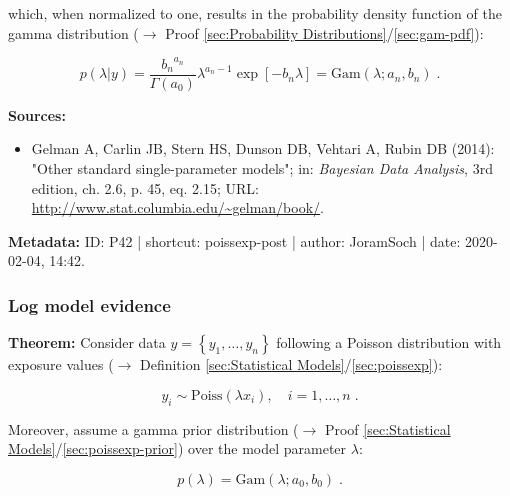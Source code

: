 \documentclass[a4paper,12pt,twoside]{book}
\begin{document}
which, when normalized to one, results in the probability density function of the gamma distribution ($\rightarrow$ Proof \ref{sec:Probability Distributions}/\ref{sec:gam-pdf}):

\begin{equation} \label{eq:poissexp-post-Poiss-exp-post-s3}
p(\lambda|y) = \frac{ {b_n}^{a_n}}{\Gamma(a_0)} \lambda^{a_n-1} \exp\left[-b_n \lambda\right] = \mathrm{Gam}(\lambda; a_n, b_n) \; .
\end{equation}


\vspace{1em}
\textbf{Sources:}
\begin{itemize}
\item Gelman A, Carlin JB, Stern HS, Dunson DB, Vehtari A, Rubin DB (2014): "Other standard single-parameter models"; in: \textit{Bayesian Data Analysis}, 3rd edition, ch. 2.6, p. 45, eq. 2.15; URL: \url{http://www.stat.columbia.edu/~gelman/book/}.
\end{itemize}


\vspace{1em}
\textbf{Metadata:} ID: P42 | shortcut: poissexp-post | author: JoramSoch | date: 2020-02-04, 14:42.
\vspace{1em}



\subsubsection[\textbf{Log model evidence}]{Log model evidence} \label{sec:poissexp-lme}
\setcounter{equation}{0}

\textbf{Theorem:} Consider data $y = \left\lbrace y_1, \ldots, y_n \right\rbrace$ following a Poisson distribution with exposure values ($\rightarrow$ Definition \ref{sec:Statistical Models}/\ref{sec:poissexp}):

\begin{equation} \label{eq:poissexp-lme-Poiss-exp}
y_i \sim \mathrm{Poiss}(\lambda x_i), \quad i = 1, \ldots, n \; .
\end{equation}

Moreover, assume a gamma prior distribution ($\rightarrow$ Proof \ref{sec:Statistical Models}/\ref{sec:poissexp-prior}) over the model parameter $\lambda$:

\begin{equation} \label{eq:poissexp-lme-Poiss-exp-prior}
p(\lambda) = \mathrm{Gam}(\lambda; a_0, b_0) \; .
\end{equation}
\end{document}
